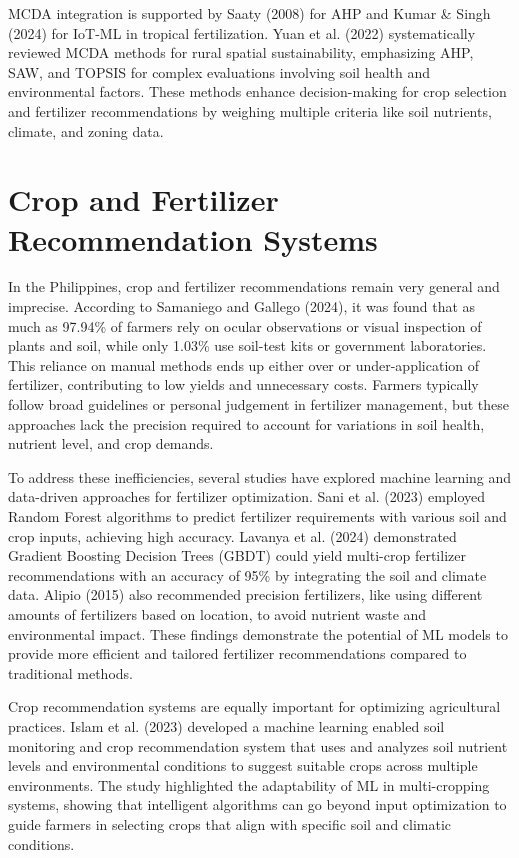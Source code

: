 {MCDA integration is supported by Saaty (2008) for AHP and Kumar \& Singh (2024) for IoT-ML in tropical fertilization. Yuan et al. (2022) systematically reviewed MCDA methods for rural spatial sustainability, emphasizing AHP, SAW, and TOPSIS for complex evaluations involving soil health and environmental factors. These methods enhance decision-making for crop selection and fertilizer recommendations by weighing multiple criteria like soil nutrients, climate, and zoning data.

\section{Crop and Fertilizer Recommendation Systems}
In the Philippines, crop and fertilizer recommendations remain very general and imprecise. According to Samaniego and Gallego (2024), it was found that as much as 97.94\% of farmers rely on ocular observations or visual inspection of plants and soil, while only 1.03\% use soil-test kits or government laboratories. This reliance on manual methods ends up either over or under-application of fertilizer, contributing to low yields and unnecessary costs. Farmers typically follow broad guidelines or personal judgement in fertilizer management, but these approaches lack the precision required to account for variations in soil health, nutrient level, and crop demands.

To address these inefficiencies, several studies have explored machine learning and data-driven approaches for fertilizer optimization. Sani et al. (2023) employed Random Forest algorithms to predict fertilizer requirements with various soil and crop inputs, achieving high accuracy. Lavanya et al. (2024) demonstrated Gradient Boosting Decision Trees (GBDT) could yield multi-crop fertilizer recommendations with an accuracy of 95\% by integrating the soil and climate data. Alipio (2015) also recommended precision fertilizers, like using different amounts of fertilizers based on location, to avoid nutrient waste and environmental impact. These findings demonstrate the potential of ML models to provide more efficient and tailored fertilizer recommendations compared to traditional methods. 

Crop recommendation systems are equally important for optimizing agricultural practices. Islam et al. (2023) developed a machine learning enabled soil monitoring and crop recommendation system that uses and analyzes soil nutrient levels and environmental conditions to suggest suitable crops across multiple environments. The study highlighted the adaptability of ML in multi-cropping systems, showing that intelligent algorithms can go beyond input optimization to guide farmers in selecting crops that align with specific soil and climatic conditions.

}
